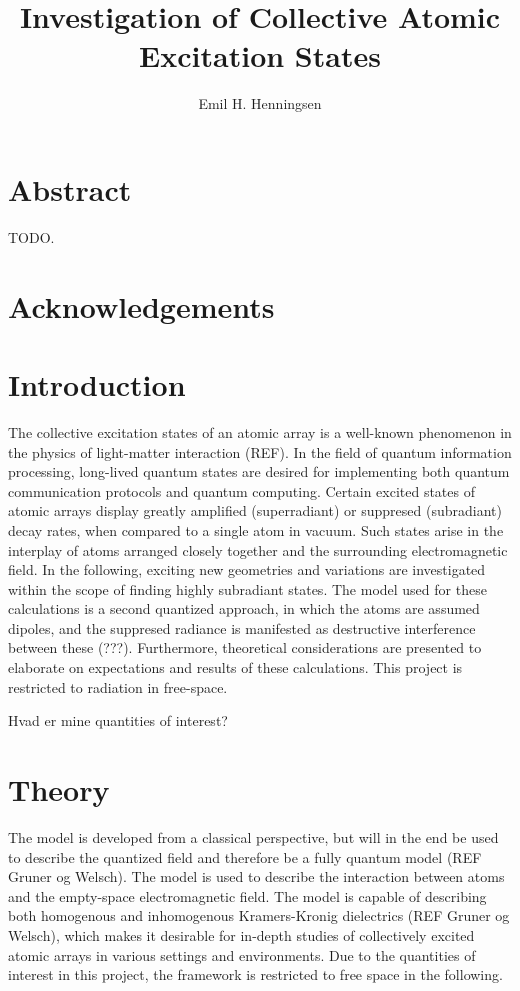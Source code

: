 \documentclass{article}
\author{Emil H. Henningsen}
\title{Investigation of Collective Atomic Excitation States}
\subtitle{}
\institute{Niels Bohr Institute}
\begin{document}
\maketitle

\section*{Abstract}

TODO. 

\section*{Acknowledgements}

\newpage
\tableofcontents

\section{Introduction}

The collective excitation states of an atomic array is a well-known phenomenon in the physics of light-matter interaction (REF). In the field of quantum information processing, long-lived quantum states are desired for implementing both quantum communication protocols and quantum computing. Certain excited states of atomic arrays display greatly amplified (superradiant) or suppresed (subradiant) decay rates, when compared to a single atom in vacuum. Such states arise in the interplay of atoms arranged closely together and the surrounding electromagnetic field. In the following, exciting new geometries and variations are investigated within the scope of finding highly subradiant states. The model used for these calculations is a second quantized approach, in which the atoms are assumed dipoles, and the suppresed radiance is manifested as destructive interference between these (???). Furthermore, theoretical considerations are presented to elaborate on expectations and results of these calculations. This project is restricted to radiation in free-space. 

Hvad er mine quantities of interest?

\section{Theory}\label{sec:theory}

The model is developed from a classical perspective, but will in the end be used to describe the quantized field and therefore be a fully quantum model (REF Gruner og Welsch). The model is used to describe the interaction between atoms and the empty-space electromagnetic field. The model is capable of describing both homogenous and inhomogenous Kramers-Kronig dielectrics (REF Gruner og Welsch), which makes it desirable for in-depth studies of collectively excited atomic arrays in various settings and environments. Due to the quantities of interest in this project, the framework is restricted to free space in the following. 
\end{document}
